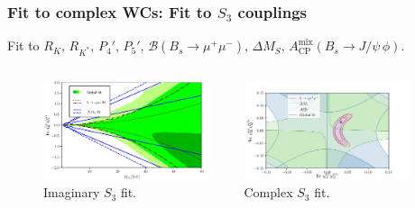 \documentclass[mathserif, 10pt]{beamer}
\begin{document}
\begin{frame}\frametitle{Fit to complex WCs: Fit to $S_3$ couplings}
    Fit to $R_K$, $R_{K^*}$, $P_4'$, $P_5'$, $\mathcal{B}(B_s \to \mu^+ \mu^-)$, $\Delta M_S$, $A_\mathrm{CP}^\mathrm{mix}(B_s \to J/\psi\, \phi)$.

    \begin{figure}
        \begin{columns}
            \begin{column}{0.48\textwidth}
                \centering
                \includegraphics[width=0.9\textwidth]{figures/fitim_LQ.pdf}
                \\ {\small Imaginary $S_3$ fit.}
            \end{column}
            \begin{column}{0.48\textwidth}
                \includegraphics[width=0.9\textwidth]{figures/fitcompl_LQ.pdf}
                \\ {\small Complex $S_3$ fit.}

            \end{column}
        \end{columns}
    \end{figure}


\end{frame}
\end{document}

